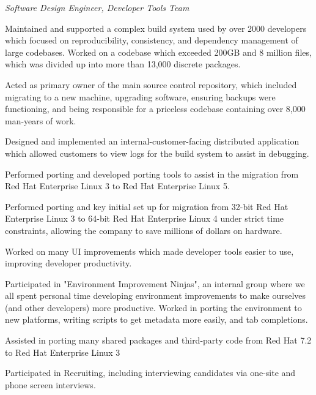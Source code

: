 \documentclass[margin,line]{resume}
\begin{document}
\begin{resume}
	\vspace{1mm} \vspace{1mm}%
	{\sl Software Design Engineer, Developer Tools Team} %
	\begin{list2}
		\vspace*{1mm}
	\item
		Maintained and supported a complex build system used by over 2000 developers
		which focused on reproducibility, consistency, and dependency management of
		large codebases.  Worked on a codebase which exceeded 200GB and 8 million
		files, which was divided up into more than 13,000 discrete packages.
	\item
		Acted as primary owner of the main source control repository, which included
		migrating to a new machine, upgrading software, ensuring backups were
		functioning, and being responsible for a priceless codebase containing over
		8,000 man-years of work.
	\item
		Designed and implemented an internal-customer-facing distributed application
		which allowed customers to view logs for the build system to assist in
		debugging.
	\item
		Performed porting and developed porting tools to assist in the migration from
		Red Hat Enterprise Linux 3 to Red Hat Enterprise Linux 5.
	\item
		Performed porting and key initial set up for migration from 32-bit Red Hat
		Enterprise Linux 3 to 64-bit Red Hat Enterprise Linux 4 under strict time
		constraints, allowing the company to save millions of dollars on hardware.
	\item
		Worked on many UI improvements which made developer tools easier to use,
		improving developer productivity.
	\item
		Participated in "Environment Improvement Ninjas", an internal group where we
		all spent personal time developing environment improvements to make ourselves
		(and other developers) more productive.  Worked in porting the environment to
		new platforms, writing scripts to get metadata more easily, and tab
		completions.
	\item
		Assisted in porting many shared packages and third-party code from Red Hat 7.2
		to Red Hat Enterprise Linux 3
	\item
		Participated in Recruiting, including interviewing candidates via
		one-site and phone screen interviews.
	\end{list2}


\end{resume}
\end{document}
